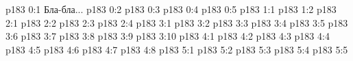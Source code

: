 \author{Промежуточные создания}
\vs p183 0:1  Бла-бла...
\vs p183 0:2 
\vs p183 0:3 
\vs p183 0:4 
\vs p183 0:5 
\vs p183 1:1 
\vs p183 1:2 
\vs p183 2:1 
\vs p183 2:2 
\vs p183 2:3 
\vs p183 2:4 
\vs p183 3:1 
\vs p183 3:2 
\vs p183 3:3 
\vs p183 3:4 
\vs p183 3:5 
\vs p183 3:6 
\vs p183 3:7 
\vs p183 3:8 
\vs p183 3:9 
\vs p183 3:10 
\vs p183 4:1 
\vs p183 4:2 
\vs p183 4:3 
\vs p183 4:4 
\vs p183 4:5 
\vs p183 4:6 
\vs p183 4:7 
\vs p183 4:8 
\vs p183 5:1 
\vs p183 5:2 
\vs p183 5:3 
\vs p183 5:4 
\vs p183 5:5 
\quizlink
